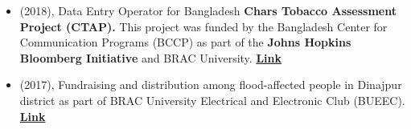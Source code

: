 \begin{itemize}[itemsep=-3pt, left=0pt]
    \item (2018), Data Entry Operator for Bangladesh \textbf{Chars Tobacco Assessment Project (CTAP).} This project was funded by the Bangladesh Center for Communication Programs (BCCP) as part of the \textbf {Johns Hopkins Bloomberg Initiative} and BRAC University. \textbf{{\href{https://dataverse.harvard.edu/dataset.xhtml?persistentId=doi:10.7910/DVN/YAAV4X}{Link}}}
    \item (2017), Fundraising and distribution among flood-affected people in Dinajpur district as part of BRAC University Electrical and Electronic Club (BUEEC). \textbf{{\href{https://www.bracu.ac.bd/club-forum/brac-university-electrical-electronic-club\#:~:text=SOCIAL}{Link}}}
    
\end{itemize}
\vspace{-12pt}

